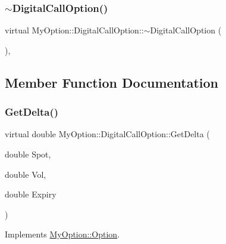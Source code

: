\hypertarget{classMyOption_1_1DigitalCallOption_acc2d14a2b95f2a43ee8a09b39591a071}{}\label{classMyOption_1_1DigitalCallOption_acc2d14a2b95f2a43ee8a09b39591a071} 
\subsubsection{\texorpdfstring{$\sim$\+Digital\+Call\+Option()}{~DigitalCallOption()}}
{\footnotesize\ttfamily virtual My\+Option\+::\+Digital\+Call\+Option\+::$\sim$\+Digital\+Call\+Option (\begin{DoxyParamCaption}{ }\end{DoxyParamCaption})\hspace{0.3cm}{\ttfamily [inline]}, {\ttfamily [virtual]}}



\subsection{Member Function Documentation}
\hypertarget{classMyOption_1_1DigitalCallOption_a58446219e938256d1f451930350737b7}{}\label{classMyOption_1_1DigitalCallOption_a58446219e938256d1f451930350737b7} 
\subsubsection{\texorpdfstring{Get\+Delta()}{GetDelta()}}
{\footnotesize\ttfamily virtual double My\+Option\+::\+Digital\+Call\+Option\+::\+Get\+Delta (\begin{DoxyParamCaption}\item[{double}]{Spot,  }\item[{double}]{Vol,  }\item[{double}]{Expiry }\end{DoxyParamCaption})\hspace{0.3cm}{\ttfamily [virtual]}}



Implements \hyperlink{classMyOption_1_1Option_a4947bde99bb5e46b79aa0f36fd353d9b}{My\+Option\+::\+Option}.

